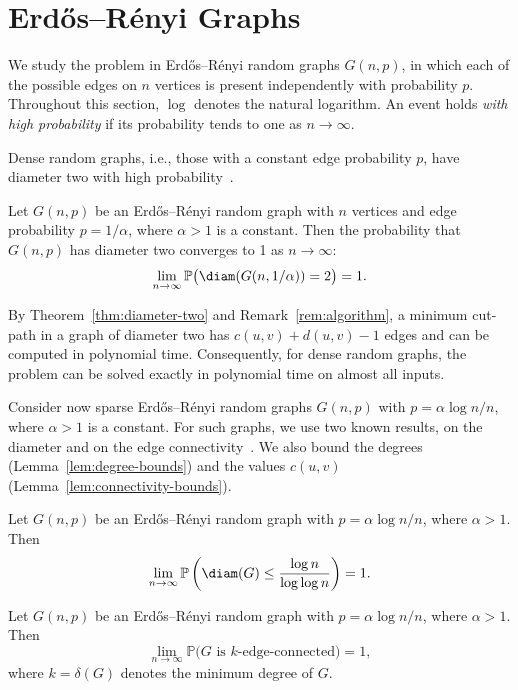 \section{Erdős–Rényi Graphs}
\label{sec:random-graphs}

We study the \MinCutPath{} problem in Erdős–Rényi random graphs $G(n, p)$, in which each of the possible edges on $n$ vertices is present independently with probability $p$.
Throughout this section, $\log$ denotes the natural logarithm.
An event holds \emph{with high probability} if its probability tends to one as $n \to \infty$.

Dense random graphs, i.e., those with a constant edge probability $p$, have diameter two with high probability~\cite{Bollobas2001}.

\begin{theorem}
\label{thm:random-diameter-two}
Let $G(n, p)$ be an Erdős–Rényi random graph with $n$ vertices and edge probability $p = 1/\alpha$, where $\alpha > 1$ is a constant.
Then the probability that $G(n, p)$ has diameter two converges to 1 as $n \to \infty$:
\[
\lim_{n \to \infty} \mathbb{P}\bigl(\diam(G(n, 1/\alpha)) = 2\bigr) = 1.
\]
\end{theorem}

By Theorem~\ref{thm:diameter-two} and Remark~\ref{rem:algorithm}, a minimum cut-path in a graph of diameter two has $c(u, v) + d(u, v) - 1$ edges and can be computed in polynomial time.
Consequently, for dense random graphs, the \MinCutPath{} problem can be solved exactly in polynomial time on almost all inputs.

Consider now sparse Erdős–Rényi random graphs $G(n, p)$ with $p = \alpha \log n / n$, where $\alpha > 1$ is a constant.
For such graphs, we use two known results, on the diameter and on the edge connectivity~\cite{Bollobas2001,ChungLu2001,Frieze2016}.
We also bound the degrees (Lemma~\ref{lem:degree-bounds}) and the values $c(u,v)$ (Lemma~\ref{lem:connectivity-bounds}).

\begin{theorem}
\label{thm:random-diameter}
Let $G(n, p)$ be an Erdős–Rényi random graph with $p = \alpha \log n / n$, where $\alpha > 1$.
Then
\[
\lim_{n\to\infty} \mathbb{P}\left( \diam(G) \leq \frac{\log n}{\log \log n} \right) = 1.
\]
\end{theorem}

\begin{theorem}
\label{thm:random-connectivity}
Let $G(n, p)$ be an Erdős–Rényi random graph with $p = \alpha \log n / n$, where $\alpha > 1$.
Then
\[
\lim_{n\to\infty} \mathbb{P}\bigl( G \text{ is } k\text{-edge-connected} \bigr) = 1,
\]
where $k = \delta(G)$ denotes the minimum degree of $G$.
\end{theorem}


